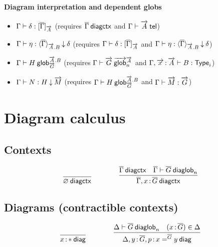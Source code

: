 \paragraph{Diagram interpretation and dependent globs}

\begin{small}
\begin{itemize}
\item ${\Gamma} \vdash {\delta} : {[ \overline{\Gamma} ]_{\overrightarrow{A}}}$
(requires ${\overline{\Gamma}} \: \mathsf{diagctx}$ and ${\Gamma} \vdash {\ensuremath{\overrightarrow{A}}} \: \mathsf{tel}$)
\item ${\Gamma} \vdash {\eta} : {\langle \overline{\Gamma} \rangle_{\overrightarrow{A}.B}}\mathbin{\downarrow}{\delta}$
(requires ${\Gamma} \vdash {\delta} : {[ \overline{\Gamma} ]_{\overrightarrow{A}}}$
and ${\Gamma} \vdash {\eta} : {\langle \overline{\Gamma} \rangle_{\overrightarrow{A}.B}}\mathbin{\downarrow}{\delta}$)
\item ${\Gamma} \vdash {H} \: \mathsf{glob}^{\overrightarrow{A}.B}_{\overrightarrow{G}}$
(requires ${\Gamma} \vdash {\ensuremath{\overrightarrow{G}}} \: \overrightarrow{\mathsf{glob}}^{\overrightarrow{A}}_{n}$ and ${\Gamma,\overrightarrow{x}\, {:}\, \overrightarrow{A}} \vdash {B} : {\mathsf{Type}_{i}}$)
\item ${\Gamma} \vdash {N} : {H}\mathbin{\downarrow}{\overrightarrow{M}}$
(requires ${\Gamma} \vdash {H} \: \mathsf{glob}^{\overrightarrow{A}.B}_{\overrightarrow{G}}$
and ${\Gamma} \vdash {\ensuremath{\overrightarrow{M}}} : {\overrightarrow{G}}$)
\end{itemize}
\end{small}

\section{Diagram calculus}

\subsection{Contexts}

\begin{small}
  \[
  \infer{\wfdiagctx{\emptyctx}}{}
  \qquad\qquad
  \infer
  {\wfdiagctx{\diag\Gamma,\tptm{x}{\diag G}}}
  {\wfdiagctx{\diag\Gamma} & \wfdiaglob{\diag\Gamma}{\diag G}n}\]
\end{small}

\subsection{Diagrams (contractible contexts)}

\begin{small}
  \[
  \infer{\wfdiag{\tptm{x}{\diagbase}}}{}
  \qquad\qquad
  \infer{\wfdiag{\Delta,\tptm{y}{\diag G},\tptm{p}{\homj{\diag{G}}{x}{y}}}}
  {\wfdiaglob{\Delta}{\diag G}n
    & (\tptm{x}{\diag{G}}) \in \Delta}\]
\end{small}

